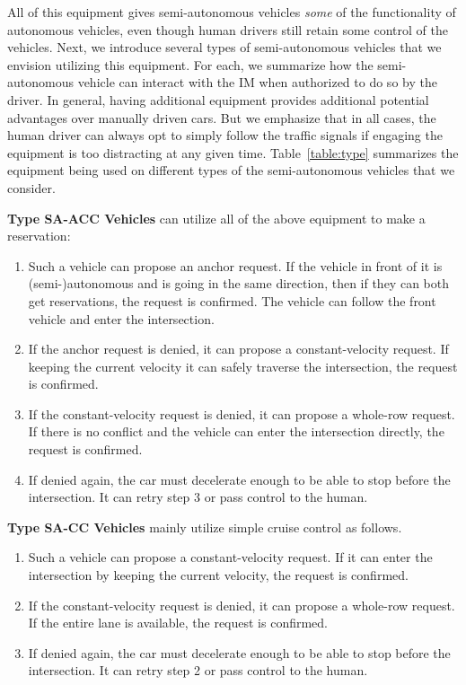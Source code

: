 All of this equipment gives semi-autonomous vehicles \emph{some} of
the functionality of autonomous vehicles, even though human drivers
still retain some control of the vehicles.  Next, we introduce several
types of semi-autonomous vehicles that we envision utilizing this
equipment.  For each, we summarize how the semi-autonomous vehicle can
interact with the IM when authorized to do so by the driver.  In
general, having additional equipment provides additional potential
advantages over manually driven cars.  But we emphasize that in all
cases, the human driver can always opt to simply follow the traffic
signals if engaging the equipment is too distracting at any given
time.  Table~\ref{table:type} summarizes the equipment being used on
different types of the semi-autonomous vehicles that we consider.


\noindent \textbf{Type SA-ACC Vehicles} can utilize all of the above
equipment to make a reservation:
\begin{enumerate}

\item Such a vehicle can propose an anchor request. If the vehicle in
front of it is (semi-)autonomous and is going in the same direction,
then if they can both get reservations, the request is confirmed. The
vehicle can follow the front vehicle and enter the intersection.

\item If the anchor request is denied, it can propose a
constant-velocity request. If keeping the current velocity it can
safely traverse the intersection, the request is confirmed.

\item If the constant-velocity request is denied, it can propose a
whole-row request. If there is no conflict and the vehicle can enter
the intersection directly, the request is confirmed.

\item If denied again, the car must decelerate enough to be able to
stop before the intersection.  It can retry step 3 or pass control to
the human.

\end{enumerate}

\noindent
\textbf{Type SA-CC Vehicles} mainly utilize simple cruise control as follows.
\begin{enumerate}

\item Such a vehicle can propose a constant-velocity request. If it
can enter the intersection by keeping the current velocity, the
request is confirmed.

\item If the constant-velocity request is denied, it can propose a whole-row
  request. If the entire lane is available, the request is confirmed.

\item If denied again, the car must decelerate enough to be able to
stop before the intersection.  It can retry step 2 or pass control to
the human.

\end{enumerate}

